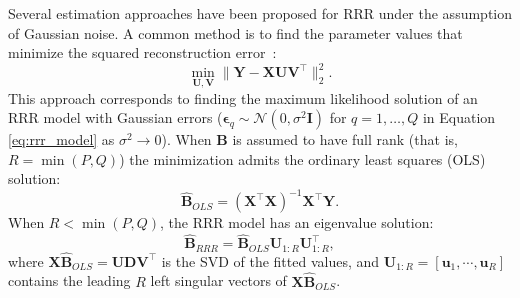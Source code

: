 \documentclass{bmcart}
\begin{document}
Several estimation approaches have been proposed for RRR under the assumption of Gaussian noise. A common method is to find the parameter values that minimize the squared reconstruction error~\citep{anderson1951estimating,reinsel1998multivariate}:
\begin{equation*}
    \min_{\mathbf{U}, \mathbf{V}} \|\mathbf{Y} - \mathbf{X} \mathbf{U} \mathbf{V}^\top\|_2^2.
\end{equation*}
This approach corresponds to finding the maximum likelihood solution of an RRR model with Gaussian errors ($\boldsymbol{\epsilon}_q \sim \mathcal{N}(0, \sigma^2 \mathbf{I})$ for $q = 1, \dots, Q$ in Equation \ref{eq:rrr_model} as $\sigma^2 \to 0$). When $\mathbf{B}$ is assumed to have full rank (that is, $R = \min(P, Q)$) the minimization admits the ordinary least squares (OLS) solution:
\begin{equation*}
    \widehat{\mathbf{B}}_{OLS} = (\mathbf{X}^\top \mathbf{X})^{-1} \mathbf{X}^\top \mathbf{Y}.
\end{equation*}
When $R < \min(P, Q)$, the RRR model has an eigenvalue solution:
\begin{equation*}
    \widehat{\mathbf{B}}_{RRR} = \widehat{\mathbf{B}}_{OLS} \mathbf{U}_{1:R} \mathbf{U}_{1:R}^\top,
\end{equation*}
where $\mathbf{X} \widehat{\mathbf{B}}_{OLS} = \mathbf{U}\mathbf{D}\mathbf{V}^\top$ is the SVD of the fitted values, and $\mathbf{U}_{1:R} = [\mathbf{u}_1, \cdots, \mathbf{u}_R]$ contains the leading $R$ left singular vectors of $\mathbf{X} \widehat{\mathbf{B}}_{OLS}$.
\end{document}
